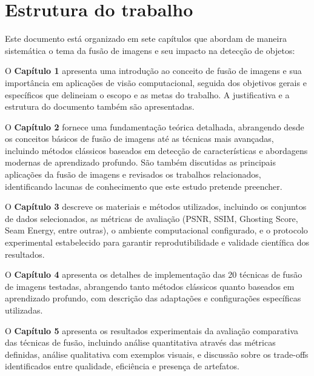 

\section{Estrutura do trabalho}\label{sec:estruturaTrabalho}

Este documento está organizado em sete capítulos que abordam de maneira sistemática o tema da fusão de imagens e seu impacto na detecção de objetos:

O \textbf{Capítulo 1} apresenta uma introdução ao conceito de fusão de imagens e sua importância em aplicações de visão computacional, seguida dos objetivos gerais e específicos que delineiam o escopo e as metas do trabalho. A justificativa e a estrutura do documento também são apresentadas.

O \textbf{Capítulo 2} fornece uma fundamentação teórica detalhada, abrangendo desde os conceitos básicos de fusão de imagens até as técnicas mais avançadas, incluindo métodos clássicos baseados em detecção de características e abordagens modernas de aprendizado profundo. São também discutidas as principais aplicações da fusão de imagens e revisados os trabalhos relacionados, identificando lacunas de conhecimento que este estudo pretende preencher.

O \textbf{Capítulo 3} descreve os materiais e métodos utilizados, incluindo os conjuntos de dados selecionados, as métricas de avaliação (PSNR, SSIM, Ghosting Score, Seam Energy, entre outras), o ambiente computacional configurado, e o protocolo experimental estabelecido para garantir reprodutibilidade e validade científica dos resultados.

O \textbf{Capítulo 4} apresenta os detalhes de implementação das 20 técnicas de fusão de imagens testadas, abrangendo tanto métodos clássicos quanto baseados em aprendizado profundo, com descrição das adaptações e configurações específicas utilizadas.

O \textbf{Capítulo 5} apresenta os resultados experimentais da avaliação comparativa das técnicas de fusão, incluindo análise quantitativa através das métricas definidas, análise qualitativa com exemplos visuais, e discussão sobre os trade-offs identificados entre qualidade, eficiência e presença de artefatos.

